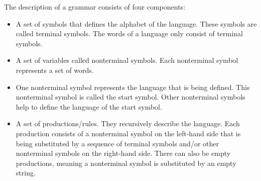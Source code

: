 The description of a grammar consists of four components:

\begin{itemize}

\item A set of symbols that defines the alphabet of the language. These symbols are called terminal symbols. The words of a language only consist of terminal symbols.

\item A set of variables called nonterminal symbols. Each nonterminal symbol represents a set of words. 

\item One nonterminal symbol represents the language that is being defined. This nonterminal symbol is called the start symbol. Other nonterminal symbols help to define the language of the start symbol.

\item A set of productions/rules. They recursively describe the language. Each production consists of a nonterminal symbol on the left-hand side that is being substituted by a sequence of terminal symbols and/or other nonterminal symbols on the right-hand side. There can also be empty productions, meaning a nonterminal symbol is substituted by an empty string.
\end{itemize}


\cite{AutomataTheory.2007}

%
%

